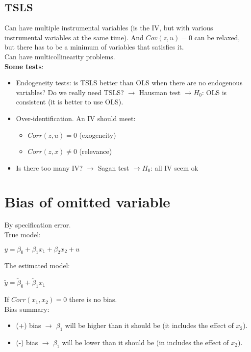 \documentclass[10pt, a4paper, landscape]{extarticle}
\begin{document}
\begin{multicols}{3}
	\subsection*{TSLS}
		Can have multiple instrumental variables (is the IV, but with various instrumental variables at the same time). And $Cov(z,u) = 0$ can be relaxed, but there has to be a minimum of variables that satisfies it.
		\\ Can have multicollinearity problems.
		\\ \textbf{Some tests}:
		\begin{itemize}[leftmargin=*]
			\item Endogeneity tests:  is TSLS better than OLS when there are no endogenous variables? Do we really need TSLS? $\rightarrow$ Hausman test $\rightarrow H_0$: OLS is consistent (it is better to use OLS).
			\item Over-identification. An IV should meet:
			\begin{itemize}[leftmargin=*]
				\item $Corr(z,u) = 0$ (exogeneity)
				\item $Corr(z,x) \neq 0$ (relevance)
			\end{itemize}
			\item Is there too many IV? $\rightarrow$ Sagan test $\rightarrow H_0$: all IV seem ok
		\end{itemize}
	
\columnbreak

\section*{Bias of omitted variable}
	By specification error.
	\\ True model:
	\begin{center}
		$y = \beta_0 + \beta_1 x_1 + \beta_2 x_2 + u$
	\end{center}
	The estimated model:
	\begin{center}
		$\tilde{y} = \tilde{\beta}_0 + \tilde{\beta}_1 x_1$
	\end{center}
	If $Corr(x_1, x_2) = 0$ there is no bias.
	\\ Bias summary:
	 \\ 
	\begin{itemize}[leftmargin=*]
		\item (+) bias $\rightarrow$ $\beta_1$ will be higher than it should be (it includes the effect of $x_2$).
		\item (-) bias $\rightarrow$ $\beta_1$ will be lower than it should be (in includes the effect of $x_2$).
	\end{itemize}


\end{multicols}
\end{document}
